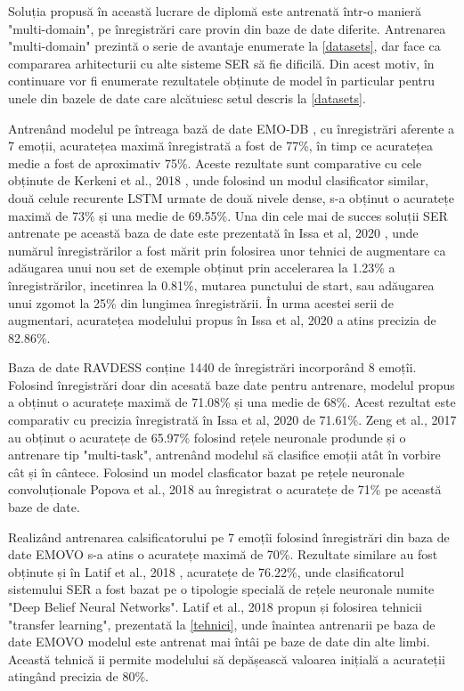 \documentclass[a4paper,12pt]{book}
\begin{document}
		 Soluția propusă în această lucrare de diplomă este antrenată într-o manieră "multi-domain", pe înregistrări care provin din baze de date diferite. Antrenarea "multi-domain" prezintă o serie de avantaje enumerate la \ref{datasets}, dar face ca compararea arhitecturii cu alte sisteme SER să fie dificilă. Din acest motiv, în continuare vor fi enumerate rezultatele obținute de model în particular pentru unele din bazele de date care alcătuiesc setul descris la \ref{datasets}. \par
		 Antrenând modelul pe întreaga bază de date EMO-DB \cite{emodb}, cu înregistrări aferente a 7 emoții, acuratețea maximă înregistrată a fost de 77\%, în timp ce acuratețea medie a fost de aproximativ 75\%. Aceste rezultate sunt comparative cu cele obținute de Kerkeni et al., 2018 \cite{comp1}, unde folosind un modul clasificator similar, două celule recurente LSTM urmate de două nivele dense, s-a obținut o acuratețe maximă de 73\% și una medie de 69.55\%. Una din cele mai de succes soluții SER antrenate pe această baza de date este prezentată în Issa et al, 2020 \cite{comp2}, unde numărul înregistrărilor a fost mărit prin folosirea unor tehnici de augmentare ca adăugarea unui nou set de exemple obținut prin accelerarea la 1.23\% a înregistrărilor, incetinrea la 0.81\%, mutarea punctului de start, sau adăugarea unui zgomot la 25\% din lungimea înregistrării. În urma acestei serii de augmentari, acuratețea modelului propus în Issa et al, 2020 \cite{comp2} a atins precizia de 82.86\%.\par
		 Baza de date RAVDESS \cite{ravdess} conține 1440 de înregistrări incorporând 8 emoțîi. Folosind înregistrări doar din acesată baze date pentru antrenare, modelul propus a obținut o acuratețe maximă de 71.08\% și una medie de 68\%. Acest rezultat este comparativ cu precizia înregistrată în Issa et al, 2020 \cite{comp2} de 71.61\%. Zeng et al., 2017 \cite{comp3} au obținut o acuratețe de 65.97\% folosind rețele neuronale produnde și o antrenare tip "multi-task", antrenând modelul să clasifice emoții atât în vorbire cât și în cântece. Folosind un model clasficator bazat pe rețele neuronale convoluționale Popova et al., 2018 \cite{comp4} au înregistrat o acuratețe de 71\% pe această baze de date. \par
		 Realizând antrenarea calsificatorului pe 7 emoțîi folosind înregistrări din baza de date EMOVO \cite{emovo} s-a atins o acuratețe maximă de 70\%. Rezultate similare au fost obținute și în Latif et al., 2018 \cite{comp5}, acuratețe de 76.22\%, unde clasificatorul sistemului SER a fost bazat pe o tipologie specială de rețele neuronale numite "Deep Belief Neural Networks". Latif et al., 2018 \cite{comp5} propun și folosirea tehnicii "transfer learning", prezentată la \ref{tehnici}, unde înaintea antrenarii pe baza de date EMOVO modelul este antrenat mai întâi pe baze de date din alte limbi. Această tehnică ii permite modelului să depășească valoarea inițială a acurateții atingând precizia de 80\%. \par 
\end{document}
